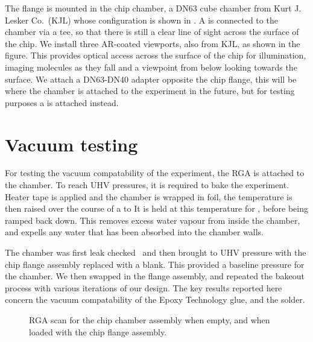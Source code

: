 The flange is mounted in the chip chamber, a DN63 cube chamber from Kurt J.
Lesker Co.\ (KJL) whose configuration is shown in .
A  is connected to the chamber via a tee, so that there is still
a clear line of sight across the surface of the chip. We install three
AR-coated viewports, also from KJL, as shown in the figure. This provides
optical access across the surface of the chip for illumination, imaging
molecules as they fall and a viewpoint from below looking towards the surface.
We attach a DN63-DN40 adapter opposite the chip flange, this will be where the
chamber is attached to the \CaF{} experiment in the future, but for testing
purposes a  is attached instead.

\begin{figure}
  \centering
  \caption{}
  \label{exper:fig:chamber}
\end{figure}


\section{Vacuum testing}

For testing the vacuum compatability of the experiment, the RGA is attached to
the chamber. To reach UHV pressures, it is required to bake the experiment.
Heater tape is applied and the chamber is wrapped in foil, the temperature is
then raised over the course of a  to   It
is held at this temperature for , before being ramped back
down. This removes excess water vapour from inside the chamber, and expells any
water that has been absorbed into the chamber walls.

The chamber was first leak checked~\cite{} and then brought to UHV pressure
with the chip flange assembly replaced with a blank. This provided a baseline
pressure for the chamber. We then swapped in the flange assembly, and repeated
the bakeout process with various iterations of our design. The key results
reported here concern the vacuum compatability of the Epoxy Technology glue,
and the solder.

\begin{figure}[h]
  \centering
  \caption{RGA scan for the chip chamber assembly when empty, and when loaded
  with the chip flange assembly.}
  \label{}
\end{figure}

